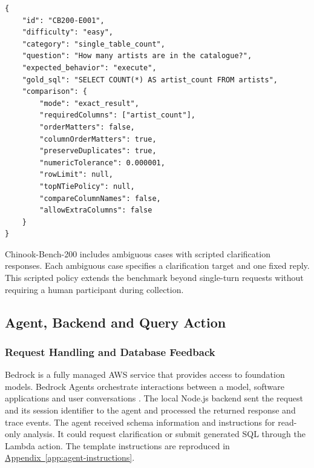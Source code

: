 \noindent\begin{minipage}{\linewidth}
\begin{lstlisting}[caption={Example benchmark record with its reference SQL and comparison contract (Source: Author, 2026).},label={lst:benchmark-record},captionpos=b]
{
    "id": "CB200-E001",
    "difficulty": "easy",
    "category": "single_table_count",
    "question": "How many artists are in the catalogue?",
    "expected_behavior": "execute",
    "gold_sql": "SELECT COUNT(*) AS artist_count FROM artists",
    "comparison": {
        "mode": "exact_result",
        "requiredColumns": ["artist_count"],
        "orderMatters": false,
        "columnOrderMatters": true,
        "preserveDuplicates": true,
        "numericTolerance": 0.000001,
        "rowLimit": null,
        "topNTiePolicy": null,
        "compareColumnNames": false,
        "allowExtraColumns": false
    }
}
\end{lstlisting}
\end{minipage}

Chinook-Bench-200 includes ambiguous cases with scripted clarification responses.
Each ambiguous case specifies a clarification target and one fixed reply.
This scripted policy extends the benchmark beyond single-turn requests without
requiring a human participant during collection.

\subsection{Agent, Backend and Query Action}
\label{sec:architecture-agent}

\subsubsection{Request Handling and Database Feedback}

Bedrock is a fully managed AWS service that
provides access to foundation models. Bedrock Agents orchestrate
interactions between a model, software applications and user conversations
\citep{awsBedrockOverview,awsBedrockAgents}.
The local Node.js \citep{nodejsIntroduction} backend sent the request and its session identifier to the
agent and processed the returned response and trace events.
The agent received schema information and instructions for read-only analysis.
It could request clarification or submit generated SQL through the Lambda action.
The template instructions are reproduced in
\hyperref[app:agent-instructions]{Appendix~\ref*{app:agent-instructions}}.

